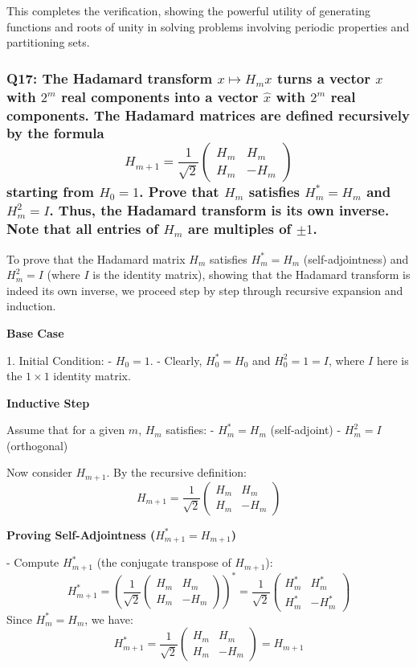 \documentclass[8pt]{article}
\begin{document}
This completes the verification, showing the powerful utility of generating functions and roots of unity in solving problems involving periodic properties and partitioning sets.

\subsubsection*{Q17:
The Hadamard transform \(x \mapsto H_m x\) turns a vector \(x\) with \(2^m\) real components into a vector \(\hat{x}\) with \(2^m\) real components. The Hadamard matrices are defined recursively by the formula
\[
H_{m+1} = \frac{1}{\sqrt{2}} \begin{pmatrix} H_m & H_m \\ H_m & -H_m \end{pmatrix}
\]
starting from \(H_0 = 1\). Prove that \(H_m\) satisfies \(H_m^* = H_m\) and \(H_m^2 = I\). Thus, the Hadamard transform is its own inverse. Note that all entries of \(H_m\) are multiples of \(\pm 1\).}

To prove that the Hadamard matrix \(H_m\) satisfies \(H_m^* = H_m\) (self-adjointness) and \(H_m^2 = I\) (where \(I\) is the identity matrix), showing that the Hadamard transform is indeed its own inverse, we proceed step by step through recursive expansion and induction.

\textbf{Base Case}

1. Initial Condition: 
   - \(H_0 = 1\). 
   - Clearly, \(H_0^* = H_0\) and \(H_0^2 = 1 = I\), where \(I\) here is the \(1 \times 1\) identity matrix.

\textbf{Inductive Step}

Assume that for a given \(m\), \(H_m\) satisfies:
- \(H_m^* = H_m\) (self-adjoint)
- \(H_m^2 = I\) (orthogonal)

Now consider \(H_{m+1}\). By the recursive definition:
\[
H_{m+1} = \frac{1}{\sqrt{2}} \begin{pmatrix} H_m & H_m \\ H_m & -H_m \end{pmatrix}
\]

\textbf{Proving Self-Adjointness (\(H_{m+1}^* = H_{m+1}\))}

- Compute \(H_{m+1}^*\) (the conjugate transpose of \(H_{m+1}\)):
  \[
  H_{m+1}^* = \left(\frac{1}{\sqrt{2}} \begin{pmatrix} H_m & H_m \\ H_m & -H_m \end{pmatrix}\right)^* = \frac{1}{\sqrt{2}} \begin{pmatrix} H_m^* & H_m^* \\ H_m^* & -H_m^* \end{pmatrix}
  \]
  Since \(H_m^* = H_m\), we have:
  \[
  H_{m+1}^* = \frac{1}{\sqrt{2}} \begin{pmatrix} H_m & H_m \\ H_m & -H_m \end{pmatrix} = H_{m+1}
  \]
\end{document}
